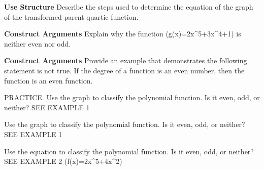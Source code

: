 \documentclass{article}
\newenvironment{practice}[2]{}{}        %
\newcommand{\answer}[1]{}               %
\newcommand{\placeholder}[2]{}          %
\newcommand{\te}[1]{}                   %
\begin{document}
\begin{practice}{10}{2}
\textbf{Use Structure} Describe the steps used to determine the equation of the graph of the transformed parent quartic function.
\placeholder{graph}{Red downward quartic with solid vertex (2,6), both ends down. Window x -8 to14,y -8 to14, grid2, x labels -4,8,12 and O; y -4,4,8,12; axes x,y arrows.}
\answer{The parent function is even because it is given that it is quartic. Since the end behavior is opposite of the parent quartic function, it is a reflection over the (x)-axis. The point (2,6) shows that the graph has shifted 2 units right and 6 units upward.}
\end{practice}
\begin{practice}{11}{3}
\textbf{Construct Arguments} Explain why the function (g(x)=2x^5+3x^4+1) is neither even nor odd.
\answer{Because (g(x)\neq g(-x)), the function is not even. Because (g(-x)\neq-g(x)), the function is not odd.}
\end{practice}
\begin{practice}{12}{3}
\textbf{Construct Arguments} Provide an example that demonstrates the following statement is not true.
If the degree of a function is an even number, then the function is an even function.
\answer{Sample: (f(x)=2x^4+x^3-2) has even degree but is not even. (f(x)=2(-x)^4+(-x)^3-2=2x^4-x^3-2), which is not equal to (f(x)).}
\te{Printed second f(x) likely means f(-x).}
\end{practice}
\begin{practice}{13}{1}
PRACTICE. Use the graph to classify the polynomial function. Is it even, odd, or neither? SEE EXAMPLE 1
\placeholder{graph}{Red increasing odd polynomial through O with very flat center, lower-left/upper-right arrowheads; x,y grid unit, window -4 to4, x labels -2,2,y -2,2; axes x,y.}
\answer{odd}
\end{practice}
\begin{practice}{14}{1}
Use the graph to classify the polynomial function. Is it even, odd, or neither? SEE EXAMPLE 1
\placeholder{graph}{Red asymmetric polynomial with local max near (-1.2,3.2), local min (0,2), crossing x-axis near -1.7; ends down left/up right. x,y window -4 to4 unit grid, labels -2,2,O; axes x,y.}
\answer{neither}
\end{practice}
\begin{practice}{15}{1}
Use the equation to classify the polynomial function. Is it even, odd, or neither? SEE EXAMPLE 2
(f(x)=2x^5+4x^2)
\answer{neither}
\end{practice}
\end{document}
